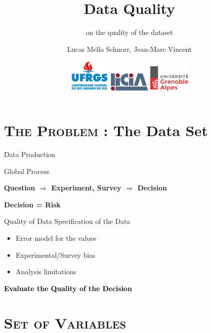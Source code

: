 \documentclass[xcolor=x11names,compress,8pt,
handout
]{beamer}
\title[Data Characterization] %
{Data Quality}
\subtitle{on the quality of the dataset}
\author%
{		
Lucas Mello Schnorr, Jean-Marc Vincent
}
\institute[LICIA] %
{%
{\large INF/UFRGS\\
Porto Alegre, Brazil – October 30th, 2017}
}
\date[Porto Alegre 2017] %
{
\includegraphics[width=2cm]{logos/ufrgs2.png}\hfill
\includegraphics[width=2cm]{logos/licia-small.png}\hfill
\includegraphics[width=2cm]{logos/uga.png}
}
\renewcommand{\(}{\begin{columns}}
\renewcommand{\)}{\end{columns}}
\newcommand{\<}[1]{\begin{column}{#1}}
\renewcommand{\>}{\end{column}}
\begin{document}
\begin{frame}
\titlepage
\end{frame}
\section[{\scshape Data Production}]{{\scshape The Problem} : The Data Set}

\begin{frame}{Data Production}
\begin{alertblock}{Global Process}
\centerline{\alert{\textbf{\large Question $\Longrightarrow$ Experiment, Survey $\Longrightarrow$  Decision}}}

\vspace{0.5cm}

\centerline{\alert{\textbf{\large Decision = Risk }}}

\end{alertblock}
\pause
\begin{alertblock}{Quality of Data }
Specification of the Data
\begin{itemize}
\item Error model for the values
\item Experimental/Survey bias  
\item Analysis limitations
\end{itemize}
\end{alertblock}
\centerline{\colorbox{yellow!85}{\textcolor{black}{\textbf{\large Evaluate the Quality of the Decision}}}}
\end{frame}

\section[{\scshape Set of Variables}]{{\scshape Set of Variables} }
\end{document}
